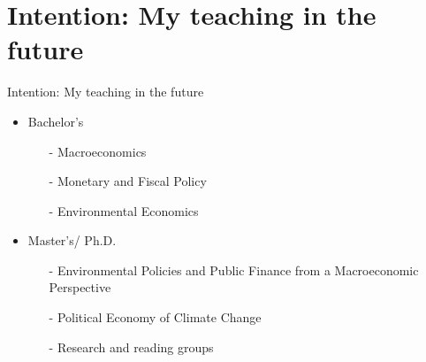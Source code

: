 \section*{Intention: My teaching in the future}
\begin{frame}{Intention: My teaching in the future}


\begin{itemize}[<+->]
	\item Bachelor's
	\begin{itemize}
		\item[-] Macroeconomics
		\item[-] Monetary and Fiscal Policy
		\item[-] Environmental Economics 
	\end{itemize}
	\item Master's/ Ph.D.
	\begin{itemize}
		\item[-] Environmental Policies and Public Finance from a Macroeconomic Perspective
		\item[-] Political Economy of Climate Change
		\item[-] Research and reading groups
	\end{itemize}
\end{itemize}
\end{frame}

